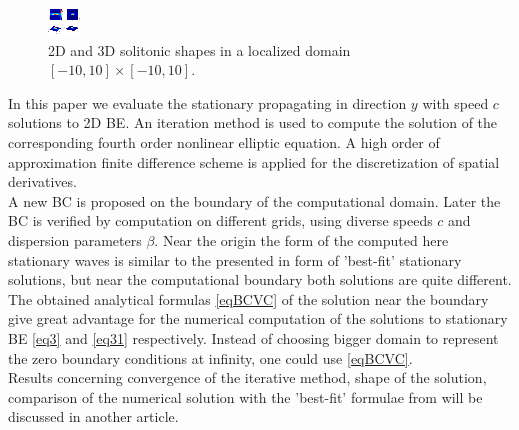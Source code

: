 \documentclass[12pt]{article}
\theoremstyle{theorem}
\theoremstyle{defi}
\begin{document}
\begin{figure}[htbp]
        \centering
              \includegraphics[width=0.98\linewidth]{figure2.eps}   
        \caption{ 2D and 3D solitonic shapes in a localized domain  $[-10, 10] \times [-10, 10]$.}
	\label{fig2}
\end{figure}

	In this paper we evaluate the stationary propagating in direction $y$ with speed $c$ solutions to 2D BE. An iteration method is used to compute the solution of the corresponding fourth order nonlinear  elliptic equation. A high order of approximation finite difference scheme is applied for the discretization of spatial derivatives.
\\
A new BC is proposed on the boundary of the computational domain. Later the BC is verified by computation on different grids, using diverse speeds $c$ and dispersion parameters $\beta$. Near the origin the form of the computed here stationary waves is similar to the presented in \cite{ref10} form of 'best-fit' stationary solutions, but near the computational boundary both solutions are quite different.
\\
The obtained analytical formulas \eqref{eqBCVC} of the solution near the boundary give great advantage for the numerical computation of the solutions to stationary BE \eqref{eq3} and \eqref{eq31} respectively. Instead of choosing bigger domain to represent the zero boundary conditions at infinity, one could use \eqref{eqBCVC}.
\\
Results concerning convergence of the iterative method, shape of the solution, comparison of the numerical solution with the 'best-fit' formulae from \cite{ref10} will be discussed in another article.
\end{document}
